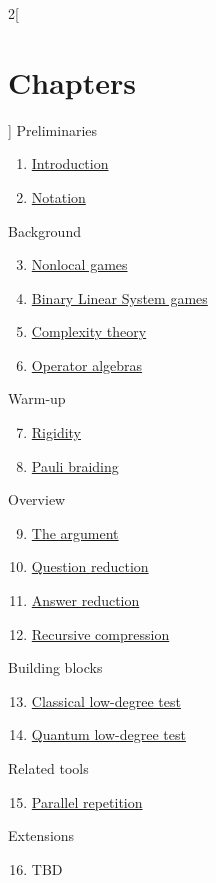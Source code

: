 \begin{multicols}{2}[\section{Chapters}]
\noindent
Preliminaries
\begin{enumerate}
\item \hyperref[introduction-section-phantom]{Introduction}
\item \hyperref[notation-section-phantom]{Notation}
\end{enumerate}
Background
\begin{enumerate}
\setcounter{enumi}{2}
\item \hyperref[nonlocalgames-section-phantom]{Nonlocal games}
\item \hyperref[blsgames-section-phantom]{Binary Linear System games}
\item \hyperref[complexitytheory-section-phantom]{Complexity theory}
\item \hyperref[operatoralgebras-section-phantom]{Operator algebras}
\end{enumerate}
Warm-up
\begin{enumerate}
\setcounter{enumi}{6}
\item \hyperref[rigidity-section-phantom]{Rigidity}
\item \hyperref[paulibraiding-section-phantom]{Pauli braiding}
\end{enumerate}
Overview
\begin{enumerate}
\setcounter{enumi}{8}
\item \hyperref[argument-section-phantom]{The argument}
\item \hyperref[questionreduction-section-phantom]{Question reduction}
\item \hyperref[answerreduction-section-phantom]{Answer reduction}
\item \hyperref[recursivecompression-section-phantom]{Recursive compression}
\end{enumerate}
Building blocks
\begin{enumerate}
\setcounter{enumi}{12}
\item \hyperref[classicalldt-section-phantom]{Classical low-degree test}
\item \hyperref[quantumldt-section-phantom]{Quantum low-degree test}
\end{enumerate}
Related tools
\begin{enumerate}
\setcounter{enumi}{14}
\item \hyperref[parallelrepetition-section-phantom]{Parallel repetition}
\end{enumerate}
Extensions
\begin{enumerate}
\setcounter{enumi}{15}
\item TBD
\end{enumerate}
\end{multicols}
